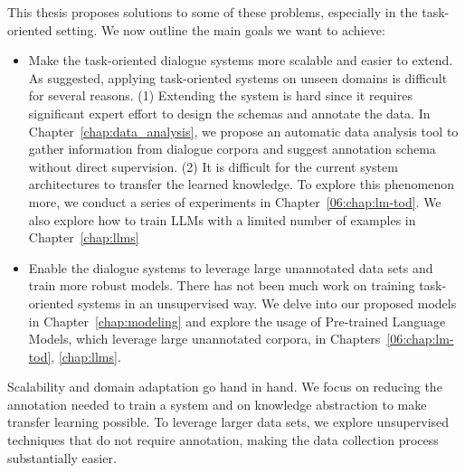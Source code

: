 This thesis proposes solutions to some of these problems, especially in the task-oriented setting.
We now outline the main goals we want to achieve:
\begin{itemize}
    \item Make the task-oriented dialogue systems more scalable and easier to extend. As suggested, applying task-oriented systems on unseen domains is difficult for several reasons. (1) Extending the system is hard since it requires significant expert effort to design the schemas and annotate the data. In Chapter~\ref{chap:data_analysis}, we propose an automatic data analysis tool to gather information from dialogue corpora and suggest annotation schema without direct supervision.
    (2) It is difficult for the current system architectures to transfer the learned knowledge. To explore this phenomenon more, we conduct a series of experiments in Chapter~\ref{06:chap:lm-tod}. We also explore how to train LLMs with a limited number of examples in Chapter~\ref{chap:llms}
    \item Enable the dialogue systems to leverage large unannotated data sets and train more robust models. There has not been much work on training task-oriented systems in an unsupervised way. We delve into our proposed models in Chapter~\ref{chap:modeling} and explore the usage of Pre-trained Language Models, which leverage large unannotated corpora, in Chapters~\ref{06:chap:lm-tod}, \ref{chap:llms}.
\end{itemize}

Scalability and domain adaptation go hand in hand.
We focus on reducing the annotation needed to train a system and on knowledge abstraction to make transfer learning possible.
To leverage larger data sets, we explore unsupervised techniques that do not require annotation, making the data collection process substantially easier.




